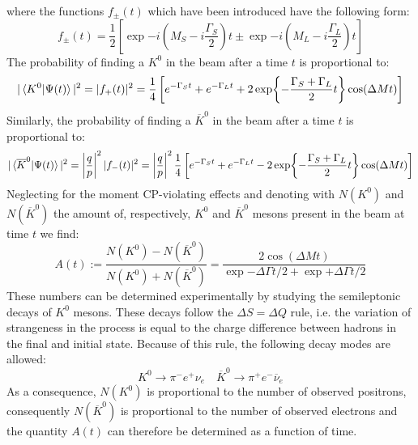 \documentclass[../main.tex]{subfiles}
\begin{document}
where the functions $f_\pm(t)$ which have been introduced have the following form:
\[
f_\pm(t)=\frac{1}{2}\left[\exp{-i\left(M_S-i\frac{\Gamma_S}{2}\right)t}\pm\exp{-i\left(M_L-i\frac{\Gamma_L}{2}\right)t}\right]
\]
The probability of finding a $K^0$ in the beam after a time $t$ is proportional to:
\[
|\braket{K^0|\Psi(t)}|^2=|f_+(t)|^2=\frac{1}{4}\left[e^{-\Gamma_St}+e^{-\Gamma_Lt}+2\exp{-\frac{\Gamma_S+\Gamma_L}{2}t}\cos(\Delta Mt)\right]
\]
Similarly, the probability of finding a $\overline{K}^0$ in the beam after a time $t$ is proportional to:
\[
|\braket{\overline{K}^0|\Psi(t)}|^2=\left|\frac{q}{p}\right|^2|f_-(t)|^2=\left|\frac{q}{p}\right|^2\frac{1}{4}\left[e^{-\Gamma_St}+e^{-\Gamma_Lt}-2\exp{-\frac{\Gamma_S+\Gamma_L}{2}t}\cos(\Delta Mt)\right]
\]
Neglecting for the moment CP-violating effects and denoting with $N(K^0)$ and $N(\overline{K}^0)$ the amount of, respectively, $K^0$ and $\overline{K}^0$ mesons present in the beam at time $t$ we find:
\[
A(t):=\frac{N(K^0)-N(\overline{K}^0)}{N(K^0)+N(\overline{K}^0)}=\frac{2\cos(\Delta Mt)}{\exp{-\Delta\Gamma t/2}+\exp{+\Delta\Gamma t/2}}
\]
These numbers can be determined experimentally by studying the semileptonic decays of $K^0$ mesons. These decays follow the $\Delta S=\Delta Q$ rule, i.e. the variation of strangeness in the process is equal to the charge difference between hadrons in the final and initial state. Because of this rule, the following decay modes are allowed:
\[
K^0\to\pi^-e^+\nu_e \quad \overline{K}^0\to\pi^+e^-\overline{\nu}_e
\]
As a consequence, $N(K^0)$ is proportional to the number of observed positrons, consequently $N(\overline{K}^0)$ is proportional to the number of observed electrons and the quantity $A(t)$ can therefore be determined as a function of time.
\end{document}
